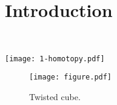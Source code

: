 \chapter{\label{chapter:1}Introduction}
\HRule \\[1.5cm]



\begin{table}
\caption{
\label{table:1-homotopy}
The homotopy groups of spheres relevant to this study and the corresponding topological spin textures. 
}
\centering
\texttt{[image: 1-homotopy.pdf]}
\fi
\end{table}

\begin{figure}[tb]
\centering
\texttt{[image: figure.pdf]}
\caption{
\label{fig:test}
Twisted cube.
}
\end{figure}

\lipsum[5]





